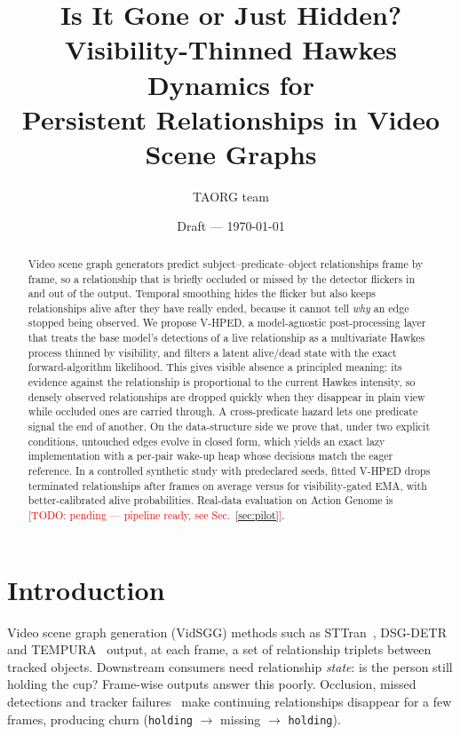 \documentclass[10pt]{article}
\title{Is It Gone or Just Hidden? Visibility-Thinned Hawkes Dynamics for\\
Persistent Relationships in Video Scene Graphs}
\author{TAORG team \todo{authors and affiliations}}
\date{Draft --- \today}
\newcommand{\todo}[1]{\textcolor{red}{[TODO: #1]}}
\begin{document}
\maketitle

\begin{abstract}
Video scene graph generators predict subject--predicate--object relationships
frame by frame, so a relationship that is briefly occluded or missed by the
detector flickers in and out of the output. Temporal smoothing hides the
flicker but also keeps relationships alive after they have really ended,
because it cannot tell \emph{why} an edge stopped being observed. We propose
V-HPED, a model-agnostic post-processing layer that treats the base model's
detections of a live relationship as a multivariate Hawkes process thinned
by visibility, and filters a latent alive/dead state with the exact
forward-algorithm likelihood. This gives visible absence a principled
meaning: its evidence against the relationship is proportional to the
current Hawkes intensity, so densely observed relationships are dropped
quickly when they disappear in plain view while occluded ones are carried
through. A cross-predicate hazard lets one predicate signal the end of
another. On the data-structure side we prove that, under two explicit
conditions, untouched edges evolve in closed form, which yields an exact
lazy implementation with a per-pair wake-up heap whose decisions match the
eager reference. In a controlled synthetic study with \synSeeds{} predeclared
seeds, fitted V-HPED drops terminated relationships after
\synFullDelay{} frames on average versus \synGatedDelay{} for
visibility-gated EMA, with better-calibrated alive probabilities.
Real-data evaluation on Action Genome is
\todo{pending --- pipeline ready, see Sec.~\ref{sec:pilot}}.
\end{abstract}

\section{Introduction}
Video scene graph generation (VidSGG) methods such as
STTran~\cite{cong2021sttran}, DSG-DETR~\cite{feng2023dsgdetr} and
TEMPURA~\cite{nag2023tempura} output, at each frame, a set of
relationship triplets between tracked objects. Downstream consumers need
relationship \emph{state}: is the person still holding the cup? Frame-wise
outputs answer this poorly. Occlusion, missed detections and tracker
failures~\cite{zhang2022bytetrack} make continuing relationships disappear
for a few frames, producing churn
(\texttt{holding} $\to$ missing $\to$ \texttt{holding}).
\end{document}
